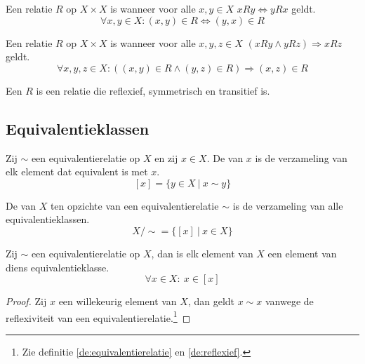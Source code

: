 \documentclass[main.tex]{subfiles}
\begin{document}
\begin{de}
  \label{de:symmetrisch}
  Een relatie $R$ op $X \times X$ is  wanneer voor alle $x,y\in X$ $xRy \Leftrightarrow yRx$ geldt.
  \[ \forall x,y \in X: (x,y) \in R \Leftrightarrow (y,x) \in R\]
\end{de}

\begin{de}
  \label{de:transitief}
  Een relatie $R$ op $X \times X$ is  wanneer voor alle $x,y,z\in X$ $(xRy \wedge yRz) \Rightarrow xRz$ geldt.
  \[ \forall x,y,z \in X: ((x,y) \in R \wedge (y,z) \in R) \Rightarrow (x,z) \in R\]
\end{de}

\begin{de}
  \label{de:equivalentierelatie}
  Een  $R$ is een relatie die reflexief, symmetrisch en transitief is.
\end{de}

\subsection{Equivalentieklassen}
\label{sec:equivalentieklassen}

\begin{de}
  Zij $\sim$ een equivalentierelatie op $X$ en zij $x \in X$.
  De  van $x$ is de verzameling van elk element dat equivalent is met $x$.
  \[ [x] = \{ y \in X\ |\ x \sim y \} \]
\end{de}

\begin{de}
  De  van $X$ ten opzichte van een equivalentierelatie $\sim$ is de verzameling van alle equivalentieklassen.
  \[ X/\sim = \{[x] \ |\ x \in X \}\]
\end{de}

\begin{st}
  \label{st:element-in-equivalentieklasse}
  Zij $\sim$ een equivalentierelatie op $X$, dan is elk element van $X$ een element van diens equivalentieklasse.
  \[ \forall x \in X:\ x \in [x] \]
  
  \begin{proof}
    Zij $x$ een willekeurig element van $X$, dan geldt $x \sim x$ vanwege de reflexiviteit van een equivalentierelatie.\footnote{Zie definitie \ref{de:equivalentierelatie} en \ref{de:reflexief}.}
  \end{proof}
\end{st}
\end{document}

